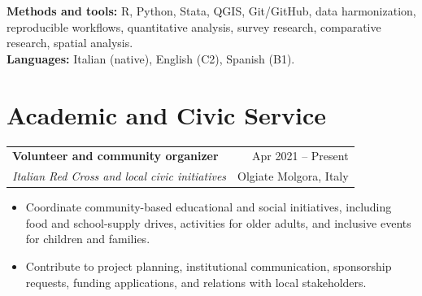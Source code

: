 \documentclass[11pt,a4paper]{article}
\makeatletter
\newcommand{\cventry}[4]{%
  \begin{tabularx}{\textwidth}{@{}Xr@{}}
    {\textbf{#1}} & {#4}\\
    {\emph{#2}} & {#3}
  \end{tabularx}\vspace{0.2em}
}
\makeatother
\begin{document}
\textbf{Methods and tools:} R, Python, Stata, QGIS, Git/GitHub, data harmonization, reproducible workflows, quantitative analysis, survey research, comparative research, spatial analysis.\\
\textbf{Languages:} Italian (native), English (C2), Spanish (B1).

\section*{Academic and Civic Service}

\cventry{Volunteer and community organizer}{Italian Red Cross and local civic initiatives}{Olgiate Molgora, Italy}{Apr 2021 -- Present}
\begin{itemize}
  \item Coordinate community-based educational and social initiatives, including food and school-supply drives, activities for older adults, and inclusive events for children and families.
  \item Contribute to project planning, institutional communication, sponsorship requests, funding applications, and relations with local stakeholders.
\end{itemize}
\end{document}
